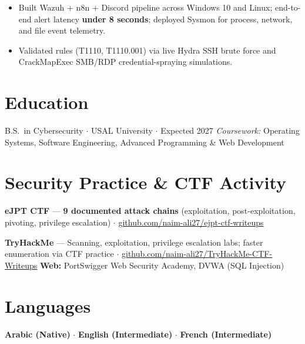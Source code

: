\documentclass[10pt]{article}
\begin{document}
\begin{itemize}
  \item Built Wazuh + n8n + Discord pipeline across Windows 10 and Linux; end-to-end alert latency
    \textbf{under 8 seconds}; deployed Sysmon for process, network, and file event telemetry.
  \item Validated rules (T1110, T1110.001) via live Hydra SSH brute force and CrackMapExec
    SMB/RDP credential-spraying simulations.
\end{itemize}

\section{Education}

B.S.\ in Cybersecurity $\cdot$ USAL University $\cdot$ Expected 2027 \quad
\textit{Coursework:} Operating Systems, Software Engineering, Advanced Programming \& Web Development

\section{Security Practice \& CTF Activity}

\textbf{eJPT CTF} --- \textbf{9 documented attack chains} (exploitation, post-exploitation, pivoting, privilege escalation) $\cdot$
\href{https://github.com/naim-ali27/ejpt-ctf-writeups}{\small github.com/naim-ali27/ejpt-ctf-writeups}

\smallskip
\textbf{TryHackMe} --- Scanning, exploitation, privilege escalation labs; faster enumeration via CTF practice $\cdot$
\href{https://github.com/naim-ali27/TryHackMe-CTF-Writeups}{\small github.com/naim-ali27/TryHackMe-CTF-Writeups}
\quad\textbf{Web:} PortSwigger Web Security Academy, DVWA (SQL Injection)

\section{Languages}

\textbf{Arabic (Native)} $\cdot$ \textbf{English (Intermediate)} $\cdot$ \textbf{French (Intermediate)}
\end{document}
